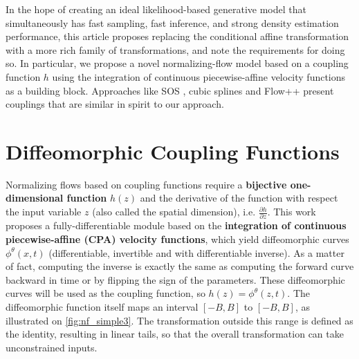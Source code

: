 In the hope of creating an ideal likelihood-based generative model that simultaneously has fast sampling, fast inference, and strong density estimation performance, this article proposes replacing the conditional affine transformation \cite{kingma2016improved} with a more rich family of transformations, and note the requirements for doing so. In particular, we propose a novel normalizing-flow model based on a coupling function $h$ using the integration of continuous piecewise-affine velocity functions as a building block. Approaches like SOS \cite{Jaini2019}, cubic splines \cite{durkan2019cubic} and Flow++  \cite{ho2019flow} present couplings that are similar in spirit to our approach. 

\section{Diffeomorphic Coupling Functions}\label{sec:method_6}

Normalizing flows based on coupling functions require a \textbf{bijective one-dimensional function} $h(z)$ and the derivative of the function with respect the input variable $z$ (also called the spatial dimension), i.e. $\frac{\partial h}{\partial z}$.
This work proposes a fully-differentiable module based on the \textbf{integration of continuous piecewise-affine (CPA) velocity functions}, which yield diffeomorphic curves $\phi^{\theta}(x,t)$ (differentiable, invertible and with differentiable inverse). As a matter of fact, computing the inverse is exactly the same as computing the forward curve backward in time or by flipping the sign of the parameters. These diffeomorphic curves will be used as the coupling function, so $h(z) = \phi^{\theta}(z,t)$. 
The diffeomorphic function itself maps an interval $[-B, B]$ to $[-B, B]$, as illustrated on \cref{fig:nf_simple3}. The transformation outside this range is defined as the identity, resulting in linear tails, so that the overall transformation can take unconstrained inputs.

